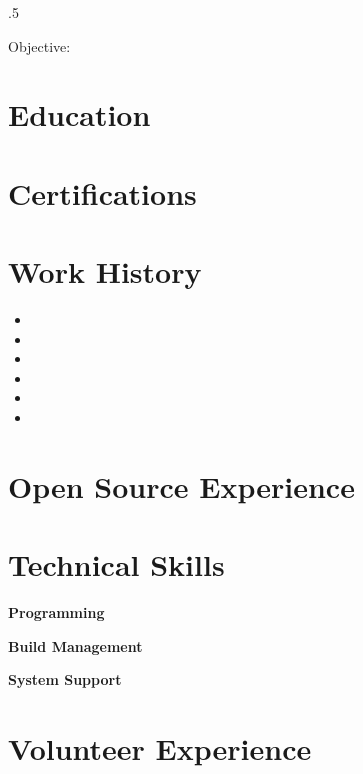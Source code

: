 \documentclass{cls/res}
\begin{document}
	\thispagestyle{empty} %
	\address{}
	\address{}


	\begin{resume}
		\vspace{0.1in}
		\moveleft.5\sectionwidth\centerline{Objective: }

		\section{Education}
			\vspace{0.1in}
			

		\section{Certifications}
			\vspace{0.1in}
			

		\section{Work History}
			\begin{itemize}
				\item[] 
				\item[] 
				\item[] 
				\item[] 
				\item[] 
				\item[] 
			\end{itemize}

		\section{Open Source Experience}
			\vspace{0.1in}
			

		\section{Technical Skills}
			\vspace{0.1in}
			{\bf Programming}
				
			{\bf Build Management}
				
			{\bf System Support}
				

		\section{Volunteer Experience}
			\vspace{0.1in}
			

	\end{resume}
\end{document}
